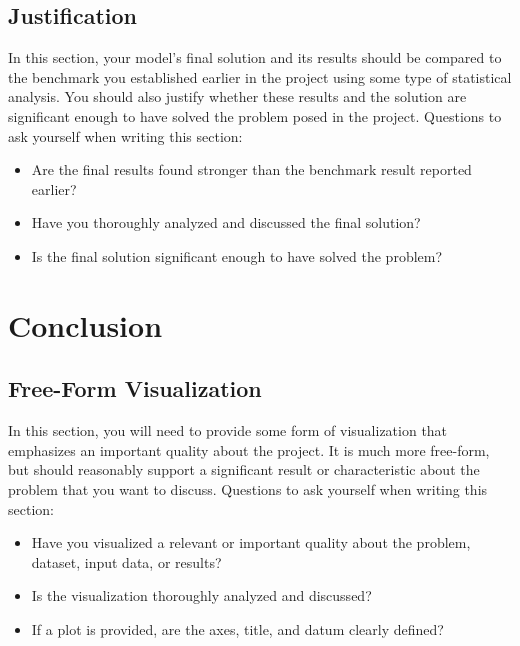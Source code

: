 \documentclass[twoside,openright,titlepage,numbers=noenddot,headinclude,%
               footinclude=true,cleardoublepage=empty,abstractoff,BCOR=5mm,%
               paper=a4,fontsize=11pt,ngerman,american]{scrreprt}
\numberwithin{theorem}{chapter}
\numberwithin{definition}{chapter}
\numberwithin{algorithm}{chapter}
\numberwithin{figure}{chapter}
\numberwithin{table}{chapter}
\numberwithin{equation}{chapter}
\begin{document}
\section*{Justification}
In this section, your model’s final solution and its results should be compared to the benchmark you established earlier in the project using some type of statistical analysis. You should also justify whether these results and the solution are significant enough to have solved the problem posed in the project. Questions to ask yourself when writing this section:
\begin{itemize}%
\item Are the final results found stronger than the benchmark result reported earlier?
\item Have you thoroughly analyzed and discussed the final solution?
\item Is the final solution significant enough to have solved the problem?
\end{itemize}


\chapter*{Conclusion}

\section*{Free-Form Visualization}
In this section, you will need to provide some form of visualization that emphasizes an important quality about the project. It is much more free-form, but should reasonably support a significant result or characteristic about the problem that you want to discuss. Questions to ask yourself when writing this section:
\begin{itemize}%
\item Have you visualized a relevant or important quality about the problem, dataset, input data, or results?
\item Is the visualization thoroughly analyzed and discussed?
\item If a plot is provided, are the axes, title, and datum clearly defined?
\end{itemize}
\end{document}
